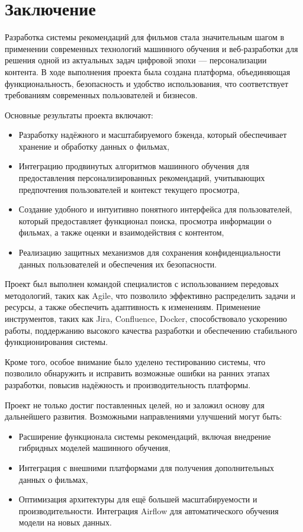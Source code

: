 \chapter{Заключение}
\label{ch:conclusion}

Разработка системы рекомендаций для фильмов стала значительным шагом в применении современных технологий машинного обучения и веб-разработки для решения одной из актуальных задач цифровой эпохи — персонализации контента. В ходе выполнения проекта была создана платформа, объединяющая функциональность, безопасность и удобство использования, что соответствует требованиям современных пользователей и бизнесов.

Основные результаты проекта включают:
\begin{itemize}
    \item Разработку надёжного и масштабируемого бэкенда, который обеспечивает хранение и обработку данных о фильмах,
    \item Интеграцию продвинутых алгоритмов машинного обучения для предоставления персонализированных рекомендаций, учитывающих предпочтения пользователей и контекст текущего просмотра,
    \item Создание удобного и интуитивно понятного интерфейса для пользователей, который предоставляет функционал поиска, просмотра информации о фильмах, а также оценки и взаимодействия с контентом,
    \item Реализацию защитных механизмов для сохранения конфиденциальности данных пользователей и обеспечения их безопасности.
\end{itemize}

Проект был выполнен командой специалистов с использованием передовых методологий, таких как Agile, что позволило эффективно распределить задачи и ресурсы, а также обеспечить адаптивность к изменениям. Применение инструментов, таких как Jira, Confluence, Docker, способствовало ускорению работы, поддержанию высокого качества разработки и обеспечению стабильного функционирования системы.

Кроме того, особое внимание было уделено тестированию системы, что позволило обнаружить и исправить возможные ошибки на ранних этапах разработки, повысив надёжность и производительность платформы.  

Проект не только достиг поставленных целей, но и заложил основу для дальнейшего развития. Возможными направлениями улучшений могут быть:
\begin{itemize}
    \item Расширение функционала системы рекомендаций, включая внедрение гибридных моделей машинного обучения,
    \item Интеграция с внешними платформами для получения дополнительных данных о фильмах,
    \item Оптимизация архитектуры для ещё большей масштабируемости и производительности. Интеграция Airflow для автоматического обучения модели на новых данных.
\end{itemize}

